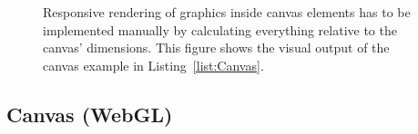 \begin{figure}[tp]
\centering
{}
\hspace{1cm}
\caption[Canvas With Responsive Circles]{
Responsive rendering of graphics inside canvas elements has to be
implemented manually by calculating everything relative to the canvas' dimensions. 
This figure shows the visual output
of the canvas example in Listing~\ref{list:Canvas}. 
}
\label{fig:Canvas}
\end{figure}







\subsection{Canvas (WebGL)}
\label{sec:CanvasWebGL}


